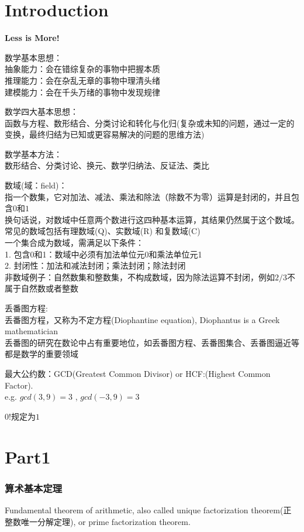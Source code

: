 \documentclass[../main.tex]{subfiles}
\begin{document}
\part{Introduction}

\textbf{Less is More!}

数学基本思想：\\
抽象能力：会在错综复杂的事物中把握本质\\
推理能力：会在杂乱无章的事物中理清头绪\\
建模能力：会在千头万绪的事物中发现规律

数学四大基本思想：\\
函数与方程、数形结合、分类讨论和转化与化归(复杂或未知的问题，通过一定的变换，最终归结为已知或更容易解决的问题的思维方法)

数学基本方法：\\
数形结合、分类讨论、换元、数学归纳法、反证法、类比

数域(域：field)：\\
指一个数集，它对加法、减法、乘法和除法（除数不为零）运算是封闭的，并且包含$0$和$1$\\
换句话说，对数域中任意两个数进行这四种基本运算，其结果仍然属于这个数域。\\
常见的数域包括有理数域(Q)、实数域(R) 和复数域(C)\\
一个集合成为数域，需满足以下条件：\\
1. 包含0和1：数域中必须有加法单位元0和乘法单位元1\\
2. 封闭性：加法和减法封闭；乘法封闭；除法封闭\\
非数域例子：自然数集和整数集，不构成数域，因为除法运算不封闭，例如$2/3$不属于自然数或者整数

丢番图方程:\\
丢番图方程，又称为不定方程(Diophantine equation), Diophantus is a Greek mathematician\\
丢番图的研究在数论中占有重要地位，如丢番图方程、丢番图集合、丢番图逼近等都是数学的重要领域

最大公约数：GCD(Greatest Common Divisor) or HCF:(Highest Common Factor).\\
e.g. $gcd(3,9)=3$ , $gcd(-3,9)=3$

$0!$规定为$1$

\part{Part1}

\section{算术基本定理}
Fundamental theorem of arithmetic, also called unique factorization theorem(正整数唯一分解定理), or prime factorization theorem.
\end{document}
